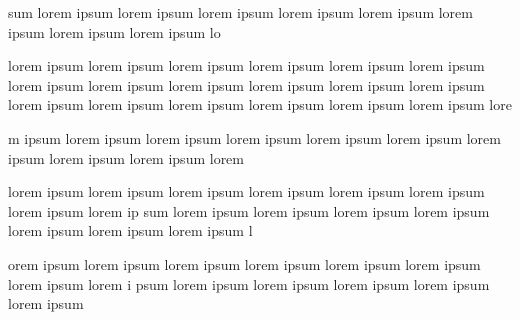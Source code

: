 \documentclass{amsart}
\begin{document}
sum lorem ipsum lorem ipsum lorem ipsum lorem ipsum lorem ipsum lorem ipsum lorem ipsum lorem ipsum lo

lorem ipsum lorem ipsum lorem ipsum lorem ipsum lorem ipsum lorem ipsum lorem ipsum lorem ipsum lorem ipsum lorem ipsum lorem ipsum lorem ipsum lorem ipsum lorem ipsum lorem ipsum lorem ipsum lorem ipsum lorem ipsum lore

m ipsum lorem ipsum lorem ipsum lorem ipsum lorem ipsum lorem ipsum lorem ipsum lorem ipsum lorem ipsum lorem 


 lorem ipsum lorem ipsum lorem ipsum lorem ipsum lorem ipsum lorem ipsum lorem ipsum lorem ip
 sum lorem ipsum lorem ipsum lorem ipsum lorem ipsum lorem ipsum lorem ipsum lorem ipsum l
 
 orem ipsum lorem ipsum lorem ipsum lorem ipsum lorem ipsum lorem ipsum lorem ipsum lorem i
 psum lorem ipsum lorem ipsum lorem ipsum lorem ipsum lorem ipsum  
\end{document}
